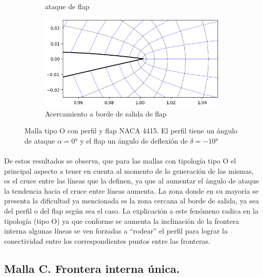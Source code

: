 \documentclass[letterpaper, openright, 12pt]{book}
\begin{document}
\begin{figure}[htbp!]
\begin{subfigure}[t]{0.45\textwidth}
{                ataque de flap}
            \label{fig:naca4415_flap_-10_airfoil}
        \end{subfigure}
        \begin{subfigure}[c]{0.45\textwidth}
            \includegraphics[keepaspectratio,
                width=0.99\textwidth]{./img/naca4415_flap_-10_flap}
            \caption{Acercamiento a borde de salida de flap}
            \label{fig:naca4415_flap_-10_flap}
        \end{subfigure}
        \caption[Malla tipo O con perfil y flap NACA 4415 a
            $-10\si{\degree}$]{Malla tipo O con perfil y flap NACA 4415. El
            perfil tiene un ángulo de ataque $\alpha = 0\si{\degree}$ y el flap
            un ángulo de deflexión de $\delta = -10\si{\degree}$}
        \label{fig:naca4415_flap_-10}
    \end{figure}

    \paragraph*{}
    De estos resultados se observa, que para las mallas con tipología tipo O
    el principal aspecto a tener en cuenta al momento de la generación de las
    mismas, es el cruce entre las líneas que la definen, ya que al aumentar el
    ángulo de ataque la tendencia hacia el cruce entre líneas aumenta. La zona
    donde en su mayoría se presenta la dificultad ya mencionada es la zona
    cercana al borde de salida, ya sea del perfil o del flap según sea el caso.
    La explicación a este fenómeno radica en la tipología (tipo O) ya que
    conforme se aumenta la inclinación de la frontera interna algunas líneas
    se ven forzadas a ``rodear'' el perfil para lograr la conectividad entre
    los correspondientes puntos entre las fronteras.


    \subsection{Malla C. Frontera interna única.}
\end{document}
